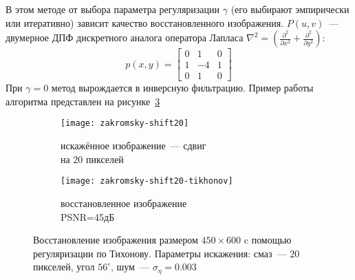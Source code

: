 В этом методе от выбора параметра регуляризации $\gamma$ (его выбирают эмпирически или итеративно) зависит качество восстановленного изображения. $P(u,v)$~--- двумерное ДПФ дискретного аналога оператора Лапласа $\nabla^2 = \left(\frac{\partial^2}{\partial x^2} + \frac{\partial^2}{\partial y^2}\right)$:
\begin{equation}
p(x,y) = \begin{bmatrix}
		0 & 1 & 0\\
		1 &-4 & 1\\
		0 & 1 & 0
	\end{bmatrix}
\end{equation}
При $\gamma = 0$ метод вырождается в инверсную фильтрацию. Пример работы алгоритма представлен на рисунке~\ref{fig:tikhonov}
\begin{figure}[h!]
	\begin{subfigure}[b]{0.5\textwidth}
		\texttt{[image: zakromsky-shift20]}
		\caption{искажённое изображение~--- сдвиг \\на 20 пикселей}
		\label{fig:zakromskiyShift20}
	\end{subfigure}%
	\begin{subfigure}[b]{0.5\textwidth}
		\texttt{[image: zakromsky-shift20-tikhonov]}
		\caption{восстановленное изображение\\ PSNR=45дБ}
		\label{fig:zakromskiyShift20Tikhonov}
	\end{subfigure}%
	\caption{Восстановление изображения размером $450\times 600$ c помощью регуляризации по Тихонову. Параметры искажения: смаз~--- 20 пикселей, угол $56^\circ$, шум~--- $\sigma_\eta=0.003$}
	\label{fig:tikhonov}
\end{figure}


